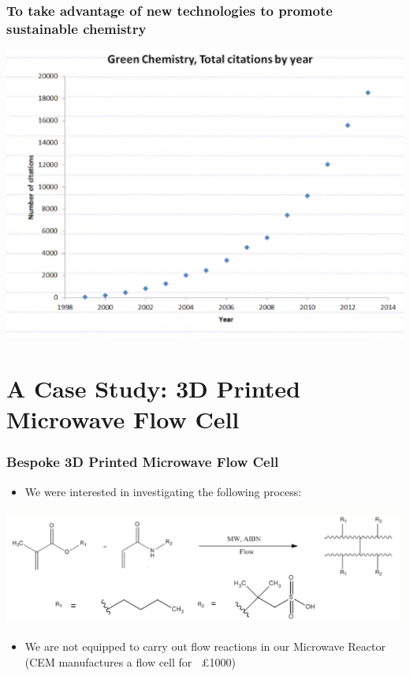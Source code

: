 \documentclass[10pt, compress]{beamer}
\begin{document}
\subsubsection{To take advantage of new technologies to promote sustainable chemistry}
\begin{frame}[fragile]
\begin{center}
\includegraphics[width=\textwidth]{greenchem.PNG}
\end{center}
\end{frame}

\section{A Case Study: 3D Printed Microwave Flow Cell}
\begin{frame}
\frametitle{Bespoke 3D Printed Microwave Flow Cell}
\begin{itemize}
    \item{We were interested in investigating the following process:}
\end{itemize}

\begin{center}
\includegraphics[width=\textwidth]{mwflowreac.PNG}
\end{center}
\begin{itemize}
    \item{We are not equipped to carry out flow reactions in our Microwave Reactor (CEM manufactures a flow cell for ~£1000)}
\end{itemize}

\end{frame}
\end{document}
